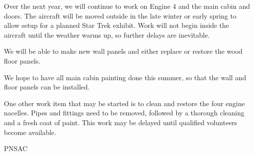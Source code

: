 Over the next year, we will continue to work on Engine 4 and the main
cabin and doors.  The aircraft will be moved outside in the late
winter or early spring to allow setup for a planned Star Trek exhibit.
Work will not begin inside the aircraft until the weather warms up, so
further delays are inevitable.  

We will be able to make new wall panels and either replace or restore
the wood floor panels.

We hope to have all main cabin painting done this summer, so that the
wall and floor panels can be installed.  

One other work item that may be started is to clean and restore the
four engine nacelles.  Pipes and fittings need to be removed, followed
by a thorough cleaning and a fresh coat of paint.  This work may be
delayed until qualified volunteers become available.



\begin{footnotesize}
  \raggedleft PNSAC\\
\end{footnotesize}



